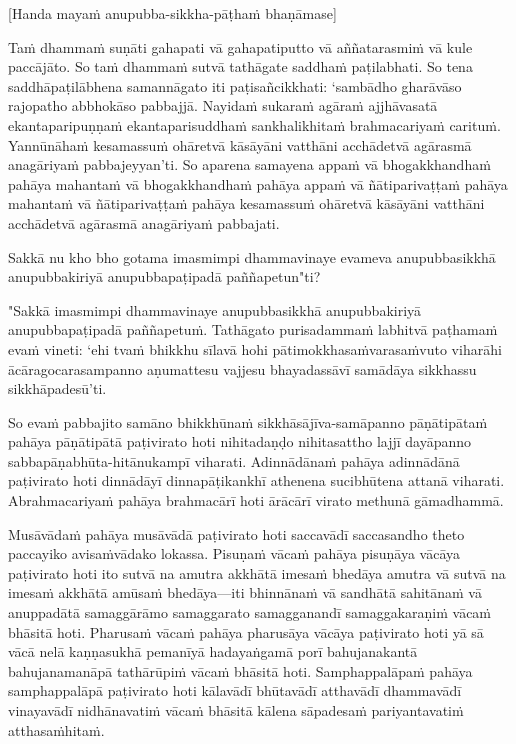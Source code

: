 \begin{center}
  [Handa mayaṁ anupubba-sikkha-pāṭhaṁ bhaṇāmase]
\end{center}

Taṁ dhammaṁ suṇāti gahapati vā gahapatiputto vā aññatarasmiṁ vā kule paccājāto. So taṁ dhammaṁ sutvā tathāgate saddhaṁ paṭilabhati. So tena saddhāpaṭilābhena samannāgato iti paṭisañcikkhati: ‘sambādho gharāvāso rajopatho abbhokāso pabbajjā. Nayidaṁ sukaraṁ agāraṁ ajjhāvasatā ekantaparipuṇṇaṁ ekantaparisuddhaṁ sankhalikhitaṁ brahmacariyaṁ carituṁ. Yannūnāhaṁ kesamassuṁ ohāretvā kāsāyāni vatthāni acchādetvā agārasmā anagāriyaṁ pabbajeyyan’ti. So aparena samayena appaṁ vā bhogakkhandhaṁ pahāya mahantaṁ vā bhogakkhandhaṁ pahāya appaṁ vā ñātiparivaṭṭaṁ pahāya mahantaṁ vā ñātiparivaṭṭaṁ pahāya kesamassuṁ ohāretvā kāsāyāni vatthāni acchādetvā agārasmā anagāriyaṁ pabbajati.

\suttaRef{[MN 27 / 38 / 51]}

Sakkā nu kho bho gotama imasmimpi dhammavinaye evameva anupubbasikkhā anupubbakiriyā anupubbapaṭipadā paññapetun"ti?

"Sakkā imasmimpi dhammavinaye anupubbasikkhā anupubbakiriyā anupubbapaṭipadā paññapetuṁ. Tathāgato purisadammaṁ labhitvā paṭhamaṁ evaṁ vineti: ‘ehi tvaṁ bhikkhu sīlavā hohi pātimokkhasaṁvarasaṁvuto viharāhi ācāragocarasampanno aṇumattesu vajjesu bhayadassāvī samādāya sikkhassu sikkhāpadesū’ti.

\suttaRef{[MN 107]}

So evaṁ pabbajito samāno bhikkhūnaṁ sikkhāsājīva-samāpanno pāṇātipātaṁ pahāya pāṇātipātā paṭivirato hoti nihitadaṇḍo nihitasattho lajjī dayāpanno sabbapāṇabhūta-hitānukampī viharati. Adinnādānaṁ pahāya adinnādānā paṭivirato hoti dinnādāyī dinnapāṭikankhī athenena sucibhūtena attanā viharati. Abrahmacariyaṁ pahāya brahmacārī hoti ārācārī virato methunā gāmadhammā.

Musāvādaṁ pahāya musāvādā paṭivirato hoti saccavādī saccasandho theto paccayiko avisaṁvādako lokassa. Pisuṇaṁ vācaṁ pahāya pisuṇāya vācāya paṭivirato hoti ito sutvā na amutra akkhātā imesaṁ bhedāya amutra vā sutvā na imesaṁ akkhātā amūsaṁ bhedāya—iti bhinnānaṁ vā sandhātā sahitānaṁ vā anuppadātā samaggārāmo samaggarato samagganandī samaggakaraṇiṁ vācaṁ bhāsitā hoti. Pharusaṁ vācaṁ pahāya pharusāya vācāya paṭivirato hoti yā sā vācā nelā kaṇṇasukhā pemanīyā hadayaṅgamā porī bahujanakantā bahujanamanāpā tathārūpiṁ vācaṁ bhāsitā hoti. Samphappalāpaṁ pahāya samphappalāpā paṭivirato hoti kālavādī bhūtavādī atthavādī dhammavādī vinayavādī nidhānavatiṁ vācaṁ bhāsitā kālena sāpadesaṁ pariyantavatiṁ atthasaṁhitaṁ.

